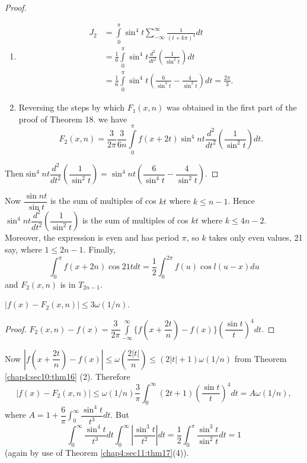 \begin{proof}
  \begin{enumerate}[(1)]
  \item \begin{align*}
    J_2 & = \int\limits^{\pi}_0 \sin^4 t \sum^{\infty}_{-\infty}
    \frac{1}{(t+k\pi)^4}dt\\ 
    & = \frac{1}{6} \int\limits^{\pi}_0 \sin^4 t \frac{d^2}{dt^2}
    \left(\frac{1}{\sin ^2 t}\right) dt\\ 
    & = \frac{1}{6}\int\limits^{\pi}_0 \sin^4 t \left(\frac{6}{\sin^4 t}-
    \frac{4}{\sin^2 t}\right) dt = \frac{2 \pi}{3}. 
  \end{align*}
  \item Reversing the steps by which $F_1(x,n)$ was obtained in the
    first part of the proof of Theorem 18. we have  
    $$
    F_2(x,n) = \frac{3}{2 \pi} \frac{3}{6n} \int\limits^{\pi}_0 f(x +
    2t) \sin^4nt \frac{d^2}{dt^2} \left(\frac{1}{\sin^2t}\right) dt. 
    $$
  \end{enumerate}

  Then\pageoriginale $\sin^4nt \dfrac{d^2}{dt^2} \left(\dfrac{1}{\sin^2t}\right) =
  \sin^4nt \left(\dfrac{6}{\sin^4t}- \dfrac{4}{\sin^2 t}\right)$. 
\end{proof}

Now $\dfrac{\sin nt}{\sin t}$ is the sum of multiples of cos $kt$
where $k \leq n-1$. Hence $\sin^4nt \dfrac{d^2}{dt^2}
\left(\dfrac{1}{\sin^2t}\right)$ is the sum of multiples of cos $kt$ where $k
\leq 4n-2$. Moreover, the expression is even and has period $\pi$, so
$k$ takes only even values, 21 say, where $1 \leq 2n-1$. Finally, 
$$
\int^{\pi}_0 f(x+2n) \cos 21t dt = \dfrac{1}{2} \int^{2 \pi}_0 f(u) 
\cos l (u-x) du  
$$
and $F_2(x,n) $ is in $T_{2n-1}$.

\begin{theorem}\label{chap4:sec11:thm19}%
  $|f(x) - F_2(x,n) | \leq 3 \omega (1/n)$.
\end{theorem}

\begin{proof}
  $F_2(x,n) -f(x) = \dfrac{3}{2 \pi} \int \limits^{\infty}_{-\infty}
  \bigg\{f(x+ \dfrac{2t}{n}) - f(x) \bigg\} \left(\dfrac{\sin t}{t}\right)^4
  dt$. 
\end{proof}

Now $|f(x+ \dfrac{2t}{n}) - f(x)| \leq \omega \left(\dfrac{2|t|}{n}\right) \leq
(2 |t| +1) \omega (1/n)$ from Theorem \ref{chap4:sec10:thm16} (2). Therefore  
$$
|f(x) -F_2 (x,n)| \leq \omega(1/n) \frac{3}{\pi} \int^{\infty}_0
(2t+1) \left(\frac{\sin t}{t}\right)^4 dt = A \omega (1/n), 
$$
where $A = 1+ \dfrac{6}{\pi} \int^{\infty}_0  \dfrac{\sin^4
  t}{t^3}dt$. But  
$$
\int^{\infty}_0  \frac{\sin^4 t}{t^3}dt \int^{\infty}_0 |\dfrac{\sin^3
  t}{t^2}| dt = \frac{1}{2} \int^{\pi}_0 \frac{\sin^3t}{\sin^2t} dt =1 
$$
(again by use of Theorem \ref{chap4:sec11:thm17}(4)).

